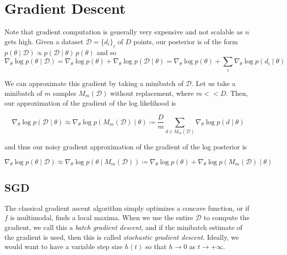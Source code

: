 \section{Gradient Descent} 

  Note that gradient computation is generally very expensive and not scalable as $n$ gets high. Given a dataset $\mathcal{D} = \{d_i\}_i$ of $D$ points, our posterior is of the form $p(\theta \mid \mathcal{D}) \propto p(\mathcal{D} \mid \theta) \, p(\theta)$ and so 
  \begin{equation}
    \nabla_\theta \log p(\theta \mid \mathcal{D}) = \nabla_\theta \log{p(\theta)} + \nabla_\theta \log{p(\mathcal{D} \mid \theta)} = \nabla_\theta \log{p(\theta)} + \sum_i \nabla_\theta \log{p(d_i \mid \theta)}
  \end{equation}

  We can approximate this gradient by taking a minibatch of $\mathcal{D}$. Let us take a minibatch of $m$ samples $M_m (\mathcal{D})$ without replacement, where $m << D$. Then, our approximation of the gradient of the log likelihood is 

  \begin{equation}
    \nabla_\theta \log{p(\mathcal{D} \mid \theta)} \approx \nabla_\theta \log{p (M_m (\mathcal{D}) \mid \theta)} \coloneqq \frac{D}{m} \sum_{d \in M_m(\mathcal{D})} \nabla_\theta \log{p(d \mid \theta)}
  \end{equation}

  and thus our noisy gradient approximation of the gradient of the log posterior is 

  \begin{equation}
    \nabla_\theta \log{p(\theta \mid \mathcal{D})} \approx \nabla_\theta \log{p(\theta \mid M_m(\mathcal{D}))} \coloneqq \nabla_\theta \log{p(\theta)} + \nabla_\theta \log{p (M_m (\mathcal{D}) \mid \theta)}
  \end{equation}

\subsection{SGD} 

  The classical gradient ascent algorithm simply optimizes a concave function, or if $f$ is multimodal, finds a local maxima. When we use the entire $\mathcal{D}$ to compute the gradient, we call this a \textit{batch gradient descent}, and if the minibatch estimate of the gradient is used, then this is called \textit{stochastic gradient descent}. Ideally, we would want to have a variable step size $h(t)$ so that $h \rightarrow 0$ as $t \rightarrow + \infty$. 


